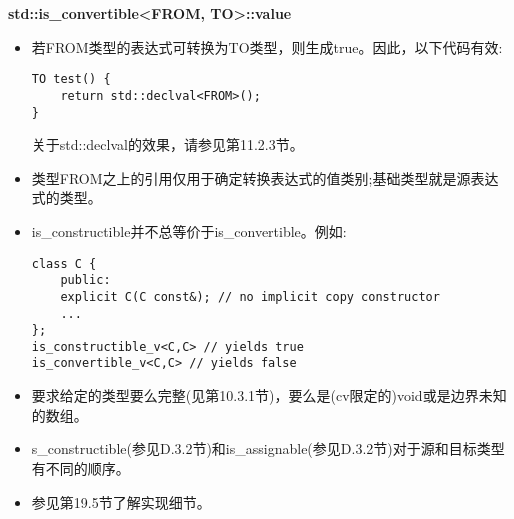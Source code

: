 \textbf{std::is\_convertible<FROM, TO>::value}

\begin{itemize}
\item
若FROM类型的表达式可转换为TO类型，则生成true。因此，以下代码有效:

\begin{lstlisting}[style=styleCXX]
TO test() {
	return std::declval<FROM>();
}
\end{lstlisting}

\begin{tcolorbox}[colback=webgreen!5!white,colframe=webgreen!75!black]
\hspace*{0.75cm}关于std::declval的效果，请参见第11.2.3节。
\end{tcolorbox}

\item
类型FROM之上的引用仅用于确定转换表达式的值类别;基础类型就是源表达式的类型。

\item
is\_constructible并不总等价于is\_convertible。例如:

\begin{lstlisting}[style=styleCXX]
class C {
	public:
	explicit C(C const&); // no implicit copy constructor
	...
};
is_constructible_v<C,C> // yields true
is_convertible_v<C,C> // yields false
\end{lstlisting}

\item
要求给定的类型要么完整(见第10.3.1节)，要么是(cv限定的)void或是边界未知的数组。

\item
s\_constructible(参见D.3.2节)和is\_assignable(参见D.3.2节)对于源和目标类型有不同的顺序。

\item
参见第19.5节了解实现细节。
\end{itemize}